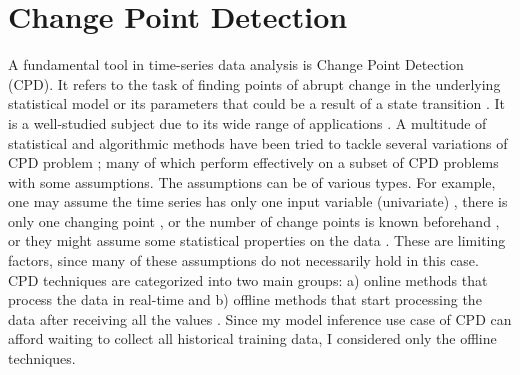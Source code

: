 \section{Change Point Detection}
A fundamental tool in time-series data analysis is Change Point Detection (CPD). It refers to the task of finding points of abrupt change in the underlying statistical model or its parameters that could be a result of a state transition \cite{aminikhanghahi2017survey}. It is a well-studied subject due to its wide range of applications \cite{basseville1993detection}.
A multitude of statistical and algorithmic methods have been tried to tackle several variations of CPD problem \cite{chen2011parametric, hasan2014information, hsu1982bayesian, lee2017implicit, oh2002analyzing, ramos2016anomalies, chowdhury2012bayesian, reeves2007review, rosenfield2010change, wang2011non, xie2013sequential, yamanishi2004line, Lavielle1999}; many of which perform effectively on a subset of CPD problems with some assumptions. The assumptions can be of various types. For example, one may assume the time series has only one input variable (univariate) \cite{fryzlewicz2014wild}, there is only one changing point \cite{bai1998testing}, or the number of change points is known beforehand \cite{lavielle2005using}, or they might assume some statistical properties on the data \cite{chen2011parametric, takeuchi2006unifying, ide2007change}. These are limiting factors, since many of these assumptions do not necessarily hold in this case. CPD techniques are categorized into two main groups: a) online methods that process the data in real-time and b) offline methods that start processing the data after receiving all the values \cite{Truong2018ChangePointSurvey}. Since my model inference use case of CPD can afford waiting to collect all historical training data, I  considered only the offline techniques. %

